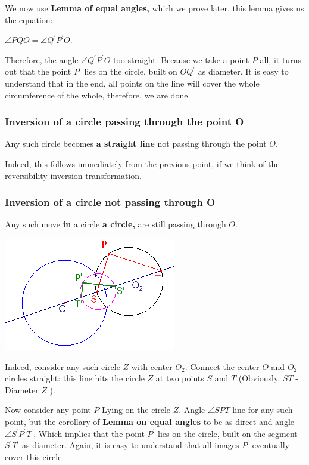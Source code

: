 We now use \textbf{Lemma of equal angles,} which we prove later, this lemma gives us the equation:

$\angle PQO = \angle Q ^ \prime P ^ \prime O.$

Therefore, the angle $\angle Q ^ \prime P ^ \prime O$ too straight. Because we take a point $P$ all, it turns out that the point $P ^ \prime$ lies on the circle, built on $O Q ^ \prime$ as diameter. It is easy to understand that in the end, all points on the line will cover the whole circumference of the whole, therefore, we are done.

\subsubsection{ Inversion of a circle passing through the point O}

Any such circle becomes \textbf{a straight line} not passing through the point $O$.

Indeed, this follows immediately from the previous point, if we think of the reversibility inversion transformation.

\subsubsection{ Inversion of a circle not passing through O}

Any such move \textbf{in} a circle \textbf{a circle,} are still passing through $O$.

\includegraphics[scale=0.5]{9.png}

Indeed, consider any such circle $Z$ with center $O_2$. Connect the center $O$ and $O_2$ circles straight: this line hits the circle $Z$ at two points $S$ and $T$ (Obviously, $ST$ - Diameter $Z$ ).

Now consider any point $P$ Lying on the circle $Z$. Angle $\angle SPT$ line for any such point, but the corollary of \textbf{Lemma on equal angles} to be as direct and angle $\angle S ^ \prime P ^ \prime T ^ \prime$, Which implies that the point $P ^ \prime$ lies on the circle, built on the segment $S ^ \prime T ^ \prime$ as diameter. Again, it is easy to understand that all images $P ^ \prime$ eventually cover this circle.

